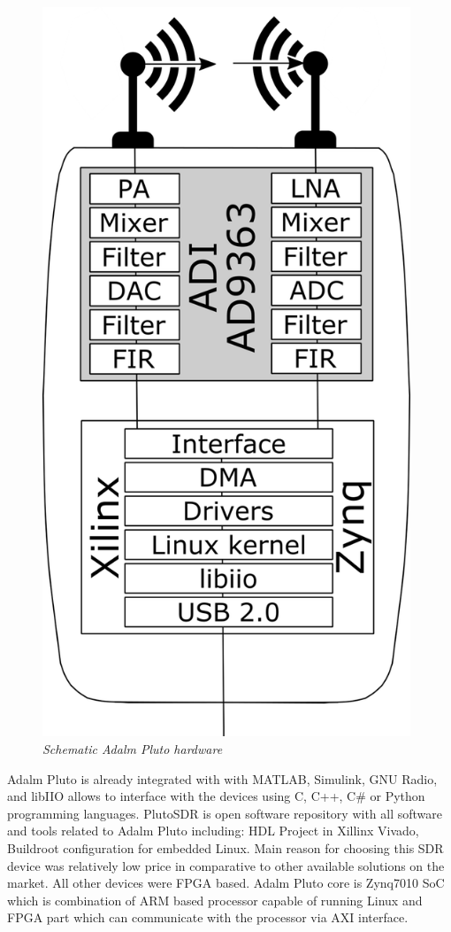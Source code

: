 \documentclass[en,printmode]{mgr}
\begin{document}
			\begin{figure}[!htb]
    			\centering
   				\includegraphics[width=11cm]{images/pluto_schematic.png}
   		 		\caption{\textit{Schematic Adalm Pluto hardware}}
			\end{figure}
			
			Adalm Pluto is already integrated with with MATLAB, Simulink, GNU Radio, and libIIO
			allows to interface with the devices using C, C++, C\# or Python programming languages.
			PlutoSDR is open software repository with all software and tools related to Adalm Pluto
			including: HDL Project in Xillinx Vivado, Buildroot configuration for embedded Linux.
			Main reason for choosing this SDR device was relatively low price in comparative to other
			available solutions on the market. All other devices were FPGA based. Adalm Pluto core is 			
			Zynq7010 SoC which is combination of ARM based processor capable of running Linux and
			FPGA part which can communicate with the processor via AXI interface.
\end{document}
